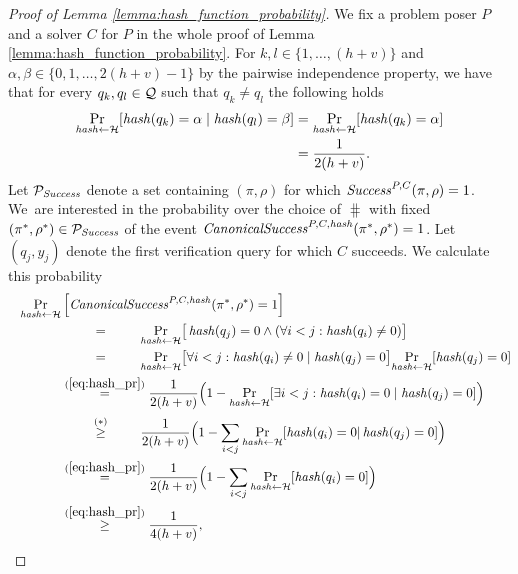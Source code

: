%
%
\begin{proof}[Proof of Lemma \ref{lemma:hash_function_probability}]
We fix a problem poser $P$ and a solver $C$ for $P$ in the whole proof of Lemma \ref{lemma:hash_function_probability}.
For $k,l \in \{1, \dotsc, (h+v)\}$ and $\alpha,\beta \in \{0,1,\dotsc,2(h+v)-1\}$ by the pairwise independence property,
we have that for every $q_k, q_l \in \mathcal{Q}$ such that $q_k \neq q_l$ the following holds
\begin{align}
 \label{eq:hash_pr}
 \underset{\operatorname{\mathit{hash}} \leftarrow \mathcal{H}}{\Pr}[\operatorname{\mathit{hash}}(q_k) = \alpha \mid \operatorname{\mathit{hash}}(q_l) = \beta] &=
 \underset{\operatorname{\mathit{hash}} \leftarrow \mathcal{H}}{\Pr}[\operatorname{\mathit{hash}}(q_k) = \alpha] \notag\\ &= \frac{1}{2(h+v)}.
\end{align}
%
Let $\mathcal{P}_{\operatorname{\mathit{Success}}}$ denote a set containing $(\pi,\rho)$ for which $\operatorname{\mathit{Success}}^{P, C}(\pi, \rho)=1$.
We~are interested in the probability over the choice of $\hash$ with fixed $(\pi^*, \rho^*) \in \mathcal{P}_{\mathit{Success}}$ of
the event $\operatorname{\mathit{CanonicalSuccess}}^{P,C,\operatorname{\mathit{hash}}}(\pi^*, \rho^*) = 1$. Let $(q_j, y_j)$ denote the first verification query for which $C$ succeeds.
We calculate this probability
\begin{align}
  \label{ineq:prob_hash_success}
  \underset{\hash \leftarrow \cH}{\Pr}&\left[\CanonicalSuccess^{P,C,\hash}(\pi^*, \rho^*) = 1\right] \notag\\
  \IndII &\overset{\hphantom{\eqref{eq:hash_pr}}}{=} \underset{\hash \leftarrow \cH}{\Pr}\big[\hash(q_j) = 0 \land (\forall i < j : \hash(q_i) \neq 0)\big] \notag\\
  \IndII &\overset{\hphantom{\eqref{eq:hash_pr}}}{=} \underset{\hash \leftarrow \cH}{\Pr}\big[
  \forall i < j : \hash(q_i) \neq 0 \mid \hash(q_j) = 0\big] \underset{\hash \leftarrow \cH}{\Pr}[\hash(q_j) = 0] \notag\\
  \IndII &\overset{(\ref{eq:hash_pr})}{=} \frac{1}{2(h+v)}\Big(1 -\underset{\hash \leftarrow \cH}{\Pr}[\exists i < j : \hash(q_i) = 0 \mid \hash(q_j) = 0] \Big) \notag\\
  \IndII &\stackrel{\substack{\hphantom{\eqref{eq:hash_pr}}\\(*)}}{\geq} \frac{1}{2(h+v)} \Big( 1 - \sum_{i < j} \underset{\hash \leftarrow \cH}{\Pr}[\hash(q_i) = 0 | \hash(q_j) = 0] \Big) \notag\\
  \IndII &\stackrel{(\ref{eq:hash_pr})}{=} \frac{1}{2(h+v)} \Big( 1 -  \sum_{i < j}\underset{\hash \leftarrow \cH}{\Pr}[\hash(q_i) = 0] \Big) \notag\\
  \IndII &\overset{(\ref{eq:hash_pr})}{\geq} \frac{1}{4(h+v)},

\end{align}
\end{proof}

